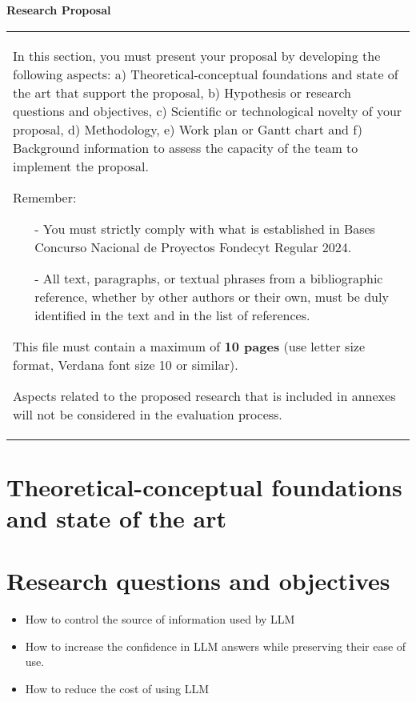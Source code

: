 \documentclass[10pt]{article}
\begin{document}
\noindent
\textbf{Research Proposal} \\

{\raggedright

\vspace{3pt} \noindent
\begin{tabular}{|p{\textwidth}|}
\hline
\parbox{\textwidth} {\raggedright  \vspace{3pt}
In this section, you must present your proposal by developing the following aspects: a) Theoretical-conceptual foundations and state of the art that support the proposal, b) Hypothesis or research questions and objectives, c) Scientific or technological novelty of your proposal, d) Methodology, e) Work plan or Gantt chart and f) Background information to assess the capacity of the team to implement the proposal.

\vspace{2mm}

Remember:
\begin{itemize}
\item[-] You must strictly comply with what is established in Bases Concurso Nacional de Proyectos Fondecyt Regular 2024.
\item[-] All text, paragraphs, or textual phrases from a bibliographic reference, whether by other authors or their own, must be duly identified in the text and in the list of references.
\end{itemize}

This file must contain a maximum of {\bf 10 pages} (use letter size format, Verdana font size 10 or similar).

\vspace{2mm}

Aspects related to the proposed research that is included in annexes will not be considered in the evaluation process.}\\
\hline
\end{tabular}
\vspace{2pt}

}

\section{Theoretical-conceptual foundations and state of the art}
\section{Research questions and objectives}
\begin{itemize}
    \item How to control the source of information used by LLM
    \item How to increase the confidence in LLM answers while preserving their ease of use.
    \item How to reduce the cost of using LLM
\end{itemize}
\end{document}
